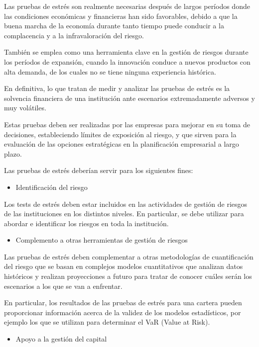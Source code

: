 \documentclass[
  12pt,
]{krantz}
\providecommand{\tightlist}{%
  \setlength{\itemsep}{0pt}\setlength{\parskip}{0pt}}
\begin{document}
Las pruebas de estrés son realmente necesarias después de largos períodos donde las condiciones económicas y financieras han sido favorables, debido a que la buena marcha de la economía durante tanto tiempo puede conducir a la complacencia y a la infravaloración del riesgo.

También se emplea como una herramienta clave en la gestión de riesgos durante los períodos de expansión, cuando la innovación conduce a nuevos productos con alta demanda, de los cuales no se tiene ninguna experiencia histórica.

En definitiva, lo que tratan de medir y analizar las pruebas de estrés es la solvencia financiera de una institución ante escenarios extremadamente adversos y muy volátiles.

Estas pruebas deben ser realizadas por las empresas para mejorar en su toma de decisiones, estableciendo límites de exposición al riesgo, y que sirven para la evaluación de las opciones estratégicas en la planificación empresarial a largo plazo.

Las pruebas de estrés deberían servir para los siguientes fines:

\begin{itemize}
\tightlist
\item
  Identificación del riesgo
\end{itemize}

Los tests de estrés deben estar incluidos en las actividades de gestión de riesgos de las instituciones en los distintos niveles. En particular, se debe utilizar para abordar e identificar los riesgos en toda la institución.

\begin{itemize}
\tightlist
\item
  Complemento a otras herramientas de gestión de riesgos
\end{itemize}

Las pruebas de estrés deben complementar a otras metodologías de cuantificación del riesgo que se basan en complejos modelos cuantitativos que analizan datos históricos y realizan proyecciones a futuro para tratar de conocer cuáles serán los escenarios a los que se van a enfrentar.

En particular, los resultados de las pruebas de estrés para una cartera pueden proporcionar información acerca de la validez de los modelos estadísticos, por ejemplo los que se utilizan para determinar el VaR (Value at Risk).

\begin{itemize}
\tightlist
\item
  Apoyo a la gestión del capital
\end{itemize}
\end{document}
